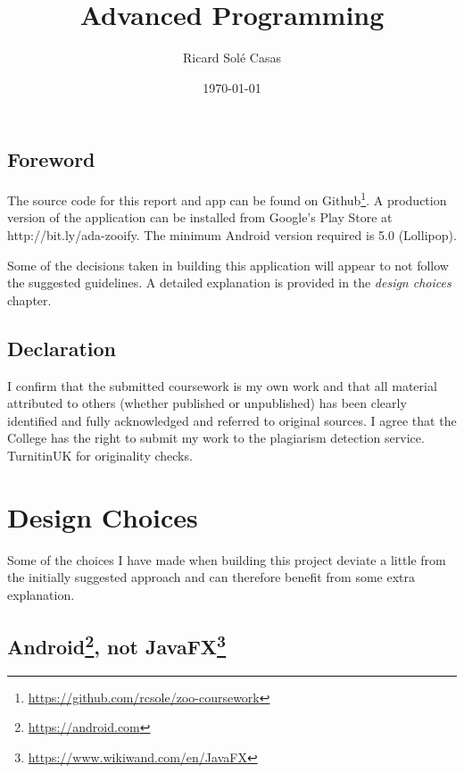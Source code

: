 \documentclass[english,a4paper,]{report}
\title{Advanced Programming}
\author{Ricard Solé Casas}
\institute{Google UK \and Ada National College for Digital Skills}
\date{\today}
\DeclareRobustCommand{\href}[2]{#2\footnote{\url{#1}}}
\begin{document}
\maketitle

\vspace*{\fill}

\section*{Foreword}

The source code for this report and app can be found on
\href{https://github.com/rcsole/zoo-coursework}{Github}. A production
version of the application can be installed from Google's Play Store at
http://bit.ly/ada-zooify. The minimum Android version required is 5.0
(Lollipop).

Some of the decisions taken in building this application will appear to
not follow the suggested guidelines. A detailed explanation is provided
in the \emph{design choices} chapter.

\section*{Declaration}

I confirm that the submitted coursework is my own work and that all
material attributed to others (whether published or unpublished) has
been clearly identified and fully acknowledged and referred to original
sources. I agree that the College has the right to submit my work to the
plagiarism detection service. TurnitinUK for originality checks.

\vspace*{\fill}

{
\setcounter{tocdepth}{2}
\tableofcontents
}
\hypertarget{design-choices}{%
\chapter{Design Choices}\label{design-choices}}

Some of the choices I have made when building this project deviate a
little from the initially suggested approach and can therefore benefit
from some extra explanation.

\hypertarget{android-not-javafx}{%
\section{\texorpdfstring{\href{https://android.com}{Android}, not
\href{https://www.wikiwand.com/en/JavaFX}{JavaFX}}{Android, not JavaFX}}\label{android-not-javafx}}
\end{document}
